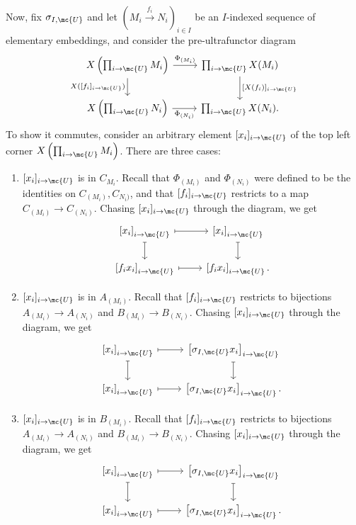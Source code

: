 Now, fix $\sigma_{I, \mc{U}}$ and let $(M_i \overset{f_i}{\to} N_i)_{i \in I}$ be an $I$-indexed sequence of elementary embeddings, and consider the pre-ultrafunctor diagram
$$
\begin{tikzcd}[ampersand replacement = \&]
X\left(\prod_{i \to \mc{U}} M_i\right)   \arrow{r}{\Phi_{(M_i)}} \arrow[swap]{d}{X([f_i]_{i \to \mc{U}})} \& \prod_{i \to \mc{U}} X(M_i) \arrow{d}{[X(f_i)]_{i \to \mc{U}}} \\
X\left(\prod_{i \to \mc{U}} N_i\right)  \arrow[swap]{r}{\Phi_{(N_i)}}  \& \prod_{i \to \mc{U}} X(N_i).
\end{tikzcd}
$$
To show it commutes, consider an arbitrary element $[x_i]_{i \to \mc{U}}$ of the top left corner $X \left(\prod_{i \to \mc{U}} M_i \right)$. There are three cases: \label{three-cases}
  \begin{enumerate}
  \item $[x_i]_{i \to \mc{U}}$ is in $C_{M_i}$.  Recall that $\Phi_{(M_i)}$ and $\Phi_{(N_i)}$ were defined to be the identities on $C_{(M_i)}, C_{N_i)}$, and that $[f_i]_{i \to \mc{U}}$ restricts to a map $C_{(M_i)} \to C_{(N_i)}.$ Chasing $[x_i]_{i \to \mc{U}}$ through the diagram, we get
    $$
    \begin{tikzcd}[ampersand replacement = \&]
\left[x_i\right]_{i \to \mc{U}} \arrow[mapsto]{r} \arrow[mapsto ]{d}\& \left[x_i\right]_{i \to \mc{U}} \arrow[mapsto]{d}  \\
      \left[f_i x_i\right]_{i \to \mc{U}} \arrow[mapsto]{r} \& \left[f_i x_i\right]_{i \to \mc{U}}.
      \end{tikzcd}
    $$
  \item $[x_i]_{i \to \mc{U}}$ is in $A_{(M_i)}$. Recall that $[f_i]_{i \to \mc{U}}$ restricts to bijections $A_{(M_i)} \to A_{(N_i)}$ and $B_{(M_i)} \to B_{(N_i)}$.
    Chasing $[x_i]_{i \to \mc{U}}$ through the diagram, we get
    $$
    \begin{tikzcd}[ampersand replacement = \&]
\left[x_i\right]_{i \to \mc{U}} \arrow[mapsto]{r} \arrow[mapsto ]{d}\& \left[\sigma_{I, \mc{U}} x_i\right]_{i \to \mc{U}} \arrow[mapsto]{d}  \\
      \left[x_i\right]_{i \to \mc{U}} \arrow[mapsto]{r} \& \left[\sigma_{I, \mc{U}} x_i\right]_{i \to \mc{U}}.
      \end{tikzcd}
    $$
  \item $[x_i]_{i \to \mc{U}}$ is in $B_{(M_i)}$. Recall that $[f_i]_{i \to \mc{U}}$ restricts to bijections $A_{(M_i)} \to A_{(N_i)}$ and $B_{(M_i)} \to B_{(N_i)}$.
    Chasing $[x_i]_{i \to \mc{U}}$ through the diagram, we get
    $$
    \begin{tikzcd}[ampersand replacement = \&]
\left[x_i\right]_{i \to \mc{U}} \arrow[mapsto]{r} \arrow[mapsto ]{d}\& \left[\sigma_{I, \mc{U}} x_i\right]_{i \to \mc{U}} \arrow[mapsto]{d}  \\
      \left[x_i\right]_{i \to \mc{U}} \arrow[mapsto]{r} \& \left[\sigma_{I, \mc{U}} x_i\right]_{i \to \mc{U}}.
      \end{tikzcd}
      $$

    \end{enumerate}
    
